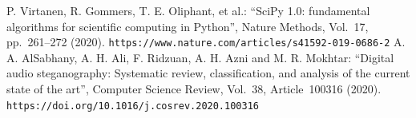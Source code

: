  P. Virtanen, R. Gommers, T. E. Oliphant, et al.:
``SciPy 1.0: fundamental algorithms for scientific computing in Python'',
Nature Methods, Vol.~17, pp.~261--272 (2020).
{\tt https://www.nature.com/articles/s41592-019-0686-2}
 A. A. AlSabhany, A. H. Ali, F. Ridzuan, A. H. Azni and
M. R. Mokhtar: ``Digital audio steganography: Systematic review,
classification, and analysis of the current state of the art'',
Computer Science Review, Vol.~38, Article~100316 (2020).
{\tt https://doi.org/10.1016/j.cosrev.2020.100316}
